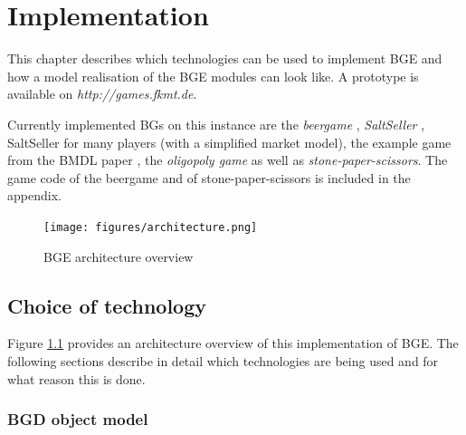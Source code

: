 \chapter{Implementation}
\label{cha:implementation}

This chapter describes which technologies can be used to implement BGE and how a model realisation of the BGE modules can look like. A prototype is available on \newline \textit{http://games.fkmt.de}. 

Currently implemented BGs on this instance are the \textit{beergame} \cite{beergame}, \textit{SaltSeller} \cite{saltseller}, SaltSeller for many players (with a simplified market model), the example game from the BMDL paper \cite{bmdl1}, the \textit{oligopoly game} as well as \textit{stone-paper-scissors}. The game code of the beergame and of stone-paper-scissors is included in the appendix.
\begin{figure}[t]
	\centering
	\texttt{[image: figures/architecture.png]}
	\caption{BGE architecture overview}
	\label{fig:arch}
\end{figure}

\section{Choice of technology}
\label{sec:imp:technology}

Figure \ref{fig:arch} provides an architecture overview of this implementation of BGE. The following sections describe in detail which technologies are being used and for what reason this is done.

\subsection{BGD object model}
\label{sub:imp:BGD}

